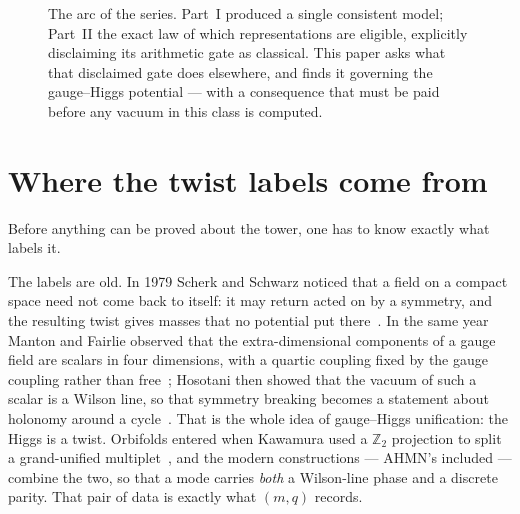 \documentclass[11pt,a4paper]{article}
\newcommand{\ZZ}{\mathbb{Z}}
\begin{document}
\begin{figure}[t]
{}
\caption{The arc of the series. Part~I produced a single consistent model; Part~II the exact
law of which representations are eligible, explicitly disclaiming its arithmetic gate as
classical. This paper asks what that disclaimed gate does elsewhere, and finds it governing
the gauge--Higgs potential --- with a consequence that must be paid before any
vacuum in this class is computed.}
\label{fig:roadmap}
\end{figure}

\section{Where the twist labels come from}\label{sec:projection}
Before anything can be proved about the tower, one has to know exactly what labels it.

The labels are old. In 1979 Scherk and Schwarz noticed that a field on a compact space need
not come back to itself: it may return acted on by a symmetry, and the resulting twist gives
masses that no potential put there~\cite{ScherkSchwarz}. In the same year Manton and Fairlie
observed that the extra-dimensional components of a gauge field are scalars in four
dimensions, with a quartic coupling fixed by the gauge coupling rather than
free~\cite{Manton,Fairlie}; Hosotani then showed that the vacuum of such a scalar is a
Wilson line, so that symmetry breaking becomes a statement about holonomy around a
cycle~\cite{Hosotani}. That is the whole idea of gauge--Higgs unification: the Higgs is a
twist. Orbifolds entered when Kawamura used a $\ZZ_2$ projection to split a
grand-unified multiplet~\cite{KawamuraGUT}, and the modern constructions --- AHMN's
included --- combine the two, so that a mode carries \emph{both} a Wilson-line phase and a
discrete parity. That pair of data is exactly what $(m,q)$ records.
\end{document}
